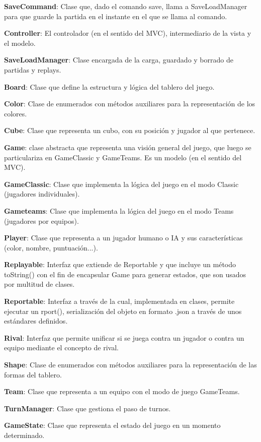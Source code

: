\documentclass[../DocumentoOficial.tex]{subfiles}
\begin{document}
\textbf{SaveCommand}: Clase que, dado el comando save, llama a SaveLoadManager para que guarde la partida en el instante en el que se llama al comando.

\textbf{Controller}: El controlador (en el sentido del MVC), intermediario de la vista y el modelo.

\textbf{SaveLoadManager}: Clase encargada de la carga, guardado y borrado de partidas y replays.

\textbf{Board}: Clase que define la estructura y lógica del tablero del juego.

\textbf{Color}: Clase de enumerados con métodos auxiliares para la representación de los colores.

\textbf{Cube}: Clase que representa un cubo, con su posición y jugador al que pertenece.

\textbf{Game}: clase abstracta que representa una visión general del juego, que luego se particulariza en GameClassic y GameTeams. Es un modelo (en el sentido del MVC).

\textbf{GameClassic}: Clase que implementa la lógica del juego en el modo Classic (jugadores individuales).

\textbf{Gameteams}: Clase que implementa la lógica del juego en el modo Teams (jugadores por equipos).

\textbf{Player}: Clase que representa a un jugador humano o IA y sus características (color, nombre, puntuación...).

\textbf{Replayable}: Interfaz que extiende de Reportable y que incluye un método toString() con el fin de encapsular Game para generar estados, que son usados por multitud de clases.

\textbf{Reportable}: Interfaz a través de la cual, implementada en clases, permite ejecutar un rport(), serialización del objeto en formato .json a través de unos estándares definidos.

\textbf{Rival}: Interfaz que permite unificar si se juega contra un jugador o contra un equipo mediante el concepto de rival.

\textbf{Shape}: Clase de enumerados con métodos auxiliares para la representación de las formas del tablero.

\textbf{Team}: Clase que representa a un equipo con el modo de juego GameTeams.

\textbf{TurnManager}: Clase que gestiona el paso de turnos.

\textbf{GameState}: Clase que representa el estado del juego en un momento determinado.
\end{document}
